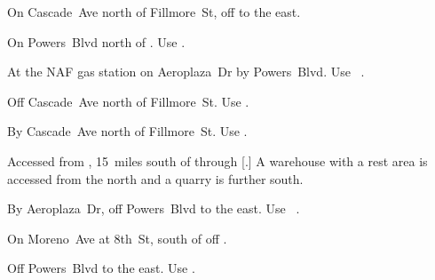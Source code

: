 
\begin{LocationList}

On Cascade~Ave north of Fillmore~St, off   to the east.

On  Powers~Blvd north of .
Use  .

At the NAF gas station on Aeroplaza~Dr by  Powers~Blvd.
Use~ .

\Location{\GarageHQ \Garage}
Off Cascade~Ave north of Fillmore~St.
Use  .

By Cascade~Ave north of Fillmore~St.
Use  .

Accessed from , 15~miles south of  through [.]
A warehouse with a rest area is accessed from the north and a quarry is further south.

By Aeroplaza~Dr, off  Powers~Blvd to the east.
Use~ .


On Moreno~Ave at 8th~St, south of  off  .


Off  Powers~Blvd to the east.
Use  .


\end{LocationList}
